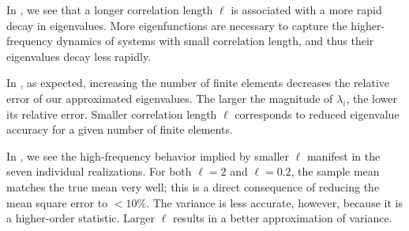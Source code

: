 \documentclass[11pt]{article}
\begin{document}
In , we see that a longer correlation length $\ell$ is associated with a more rapid decay in eigenvalues. More eigenfunctions are necessary to capture the higher-frequency dynamics of systems with small correlation length, and thus their eigenvalues decay less rapidly.

In , as expected, increasing the number of finite elements decreases the relative error of our approximated eigenvalues. The larger the magnitude of $\lambda_i$, the lower its relative error. Smaller correlation length $\ell$ corresponds to reduced eigenvalue accuracy for a given number of finite elements.

In , we see the high-frequency behavior implied by smaller $\ell$ manifest in the seven individual realizations. For both $\ell=2$ and $\ell=0.2$, the sample mean matches the true mean very well; this is a direct consequence of reducing the mean square error to $<10\%$. The variance is less accurate, however, because it is a higher-order statistic. Larger $\ell$ results in a better approximation of variance.

\end{document}
